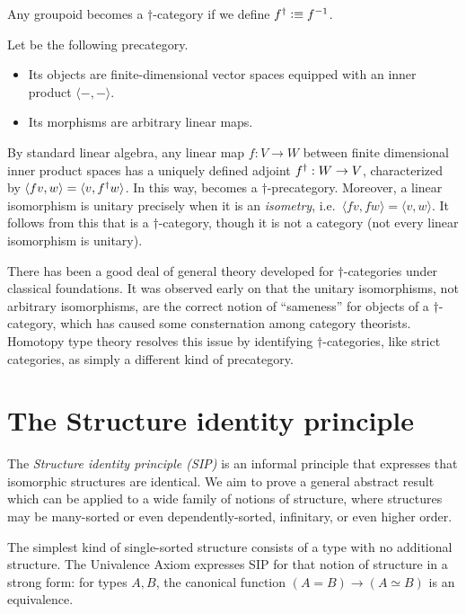 \begin{eg}
  Any groupoid becomes a $\dagger$-category if we define ${f}^{\dagger} \vcentcolon\equiv {f}^{-1}$.
\end{eg}

\begin{eg}\label{ct:hilb}
  Let \uhilb be the following precategory.
  \begin{itemize}
  \item Its objects are finite-dimensional vector spaces equipped with an inner product $\langle -,-\rangle$.
  \item Its morphisms are arbitrary linear maps.
  \end{itemize}
  By standard linear algebra, any linear map $f:V\to W$ between finite
  dimensional inner product spaces has a uniquely defined adjoint ${f}^{\dagger}:W\to V$, characterized by $\langle f v,w\rangle = \langle v,{f}^{\dagger} w\rangle$.
  In this way, \uhilb becomes a $\dagger$-precategory.
  Moreover, a linear isomorphism is unitary precisely when it is an \emph{isometry}, i.e.\ $\langle fv,fw\rangle = \langle v,w\rangle$.
  It follows from this that \uhilb is a $\dagger$-category, though it is not a category (not every linear isomorphism is unitary).
\end{eg}

There has been a good deal of general theory developed for $\dagger$-categories under classical foundations.
It was observed early on that the unitary isomorphisms, not arbitrary isomorphisms, are the correct notion of ``sameness'' for objects of a $\dagger$-category, which has caused some consternation among category theorists.
Homotopy type theory resolves this issue by identifying $\dagger$-categories, like strict categories, as simply a different kind of precategory.


\section{The Structure identity principle}
\label{sec:sip}

The \emph{Structure identity principle (SIP)} is an informal principle
that expresses that isomorphic structures are identical.  We aim to
prove a general abstract result which can be applied to a wide family
of notions of structure, where structures may be many-sorted or even
dependently-sorted, infinitary, or even higher order.

The simplest kind of single-sorted structure consists of a type with
no additional structure.  The Univalence Axiom expresses SIP for that
notion of structure in a strong form: for types $A,B$, the
canonical function $(A=B)\to (A\simeq B)$ is an equivalence.

